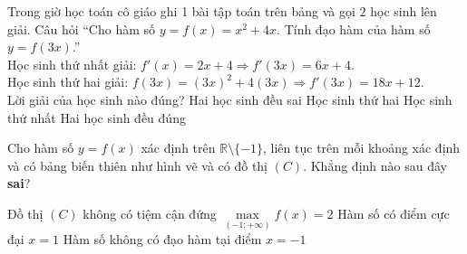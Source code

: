 \begin{ex}%
	Trong giờ học toán cô giáo ghi 1 bài tập toán trên bảng và gọi $2$ học sinh lên giải. Câu hỏi ``Cho hàm số $y=f(x)=x^2+4x$. Tính đạo hàm của hàm số $y=f(3x)$.''\\
	Học sinh thứ nhất giải: $f'(x)=2x+4\Rightarrow f'(3x) = 6x+4$.\\
	Học sinh thứ hai giải: $f(3x)=(3x)^2+4(3x) \Rightarrow f'(3x) = 18x+12$.\\
	Lời giải của học sinh nào đúng?
	\choice
	{Hai học sinh đều sai}
	{\True Học sinh thứ hai}
	{Học sinh thứ nhất}
	{Hai học sinh đều đúng}
\end{ex}

\begin{ex}%
	Cho hàm số $y=f(x)$ xác định trên $\mathbb{R}\setminus\{-1\}$, liên tục trên mỗi khoảng xác định và có bảng biến thiên như hình vẽ và có đồ thị $(C)$. Khẳng định nào sau đây \textbf{sai}?
	\begin{center}
	\end{center}
	\choice
	{\True Đồ thị $(C)$ không có tiệm cận đứng}
	{$\max\limits_{(-1;+\infty)}f(x)=2$}
	{Hàm số có điểm cực đại $x=1$}
	{Hàm số không có đạo hàm tại điểm $x=-1$}
\end{ex}

